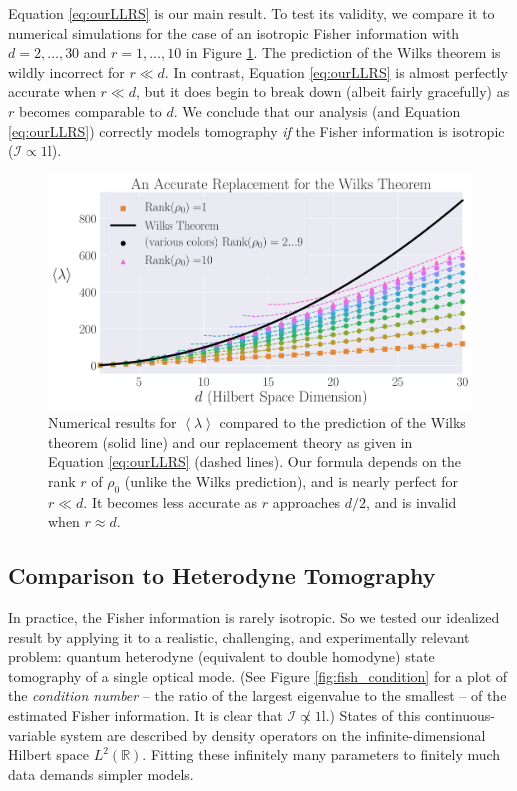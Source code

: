 \documentclass[aps,pra, twocolumn]{revtex4-1}
\newcommand{\reals}{\mathbb{R}}
\newcommand{\Id}{\mathbb{I}}
\newcommand{\expect}[1]{\ensuremath{\left\langle#1\right\rangle}}
\def\Id{1\!\mathrm{l}}
\newcommand{\Fi}{\mathcal{I}}
\begin{document}
Equation \eqref{eq:ourLLRS} is our main result.  To test its validity, we compare it to numerical simulations for the case of an isotropic Fisher information
with $d=2,\ldots,30$ and $r=1,\ldots,10$ in Figure \ref{fig:modelcomp-iso}.  The prediction of the Wilks theorem is wildly incorrect for $r\ll d$. In contrast, Equation \eqref{eq:ourLLRS} is almost perfectly accurate when $r \ll d$, but it does begin to break down (albeit fairly gracefully) as $r$ becomes comparable to $d$.  We conclude that our analysis (and Equation \eqref{eq:ourLLRS}) correctly models tomography \emph{if} the Fisher information is isotropic ($\Fi \propto \Id$).

\begin{figure}
 \includegraphics[width=\columnwidth]{Images/Figure_6.pdf}
 \caption{Numerical results for $\expect{\lambda}$ compared to the prediction of the Wilks theorem (solid line) and our replacement theory as given in Equation \eqref{eq:ourLLRS} (dashed lines).  Our formula depends on the rank $r$ of $\rho_0$ (unlike the Wilks prediction), and is nearly perfect for $r\ll d$.  It becomes less accurate as $r$ approaches $d/2$, and is invalid when $r\approx d$.}
 \label{fig:modelcomp-iso}
\end{figure}




\subsection{Comparison to Heterodyne Tomography}
\label{sec:heterotomo}
In practice, the Fisher information is rarely isotropic.  So we tested our idealized result by applying it to a realistic, challenging, and experimentally relevant problem: quantum heterodyne (equivalent to double homodyne) state tomography \cite{Lvovsky2001a, Bertrand1987, Leonhardt1995, Lvovsky2009} of a single optical mode.  (See Figure \ref{fig:fish_condition} for a plot of the \emph{condition number} -- the ratio of the largest eigenvalue to the smallest -- of the estimated Fisher information. It is clear that $\mathcal{I} \not \propto \Id$.) States of this continuous-variable system are described by density operators on the infinite-dimensional Hilbert space $L^2(\reals)$.  Fitting these infinitely many parameters to finitely much data demands simpler models.
\end{document}
